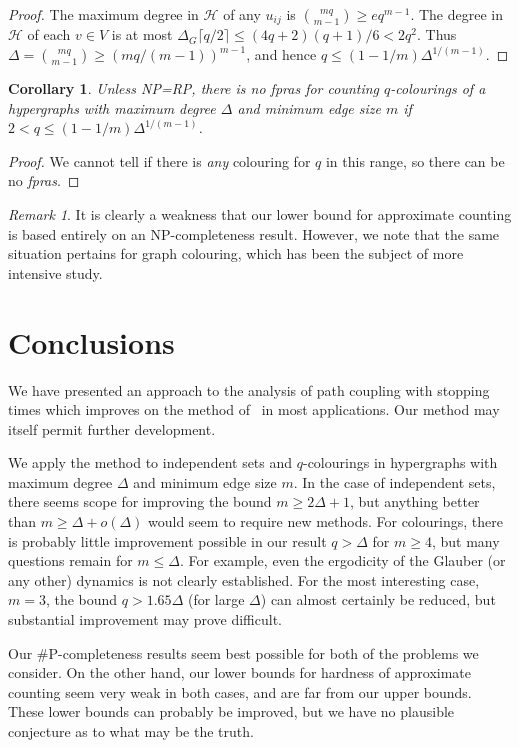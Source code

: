 \documentclass[11pt]{article}
\newtheorem{cor}[thm]{Corollary}
\theoremstyle{definition}
\theoremstyle{remark}
\newtheorem{rem}[thm]{Remark}
\newcommand{\CH}{\mathcal{H}}
\begin{document}
\begin{proof}
The maximum degree in $\CH$ of any $u_{ij}$ is $\binom{mq}{m-1} \geq
eq^{m-1}$. The degree in $\CH$ of each $v\in V$ is at most $\Delta_G\lceil
q/2\rceil \leq (4q+2)(q+1)/6 < 2q^2$. Thus $\Delta=\binom{mq}{m-1}\geq
(mq/(m-1))^{m-1}$, and hence $q\leq (1-1/m)\Delta^{1/(m-1)}$.
\end{proof}
\begin{cor}\label{h-cor10}
Unless NP\/=\/RP, there is no \emph{fpras} for counting $q$-colourings of a
hypergraphs with maximum degree $\Delta$ and minimum edge size $m$ if $2 <
q\leq (1-1/m)\Delta^{1/(m-1)}$.
\end{cor}
\begin{proof}
We cannot tell if there is \emph{any} colouring for $q$ in this range, so
there can be no \emph{fpras}.
\end{proof}
\begin{rem}
It is clearly a weakness that our lower bound for approximate counting is
based entirely on an NP-completeness result. However, we note that the same
situation pertains for  graph colouring, which has been the subject of more
intensive study.
\end{rem}
\section{Conclusions}
We have presented an approach to the analysis of path coupling with
stopping times which improves on the method of~\cite{HV04} in most
applications. Our method may itself permit further development.

We apply the method to independent sets and $q$-colourings in hypergraphs
with maximum degree $\Delta$ and minimum edge size $m$. In the case of
independent sets, there seems scope for improving the bound $m\geq 2\Delta
+1$, but anything better than $m\geq \Delta+o(\Delta)$ would seem to
require new methods. For colourings, there is probably little improvement
possible in our result $q >\Delta$ for $m\geq 4$, but many questions remain
for $m\leq \Delta$. For example, even the ergodicity of the Glauber (or any
other) dynamics is not clearly established. For the most interesting case,
$m=3$, the bound $q>1.65\Delta$ (for large $\Delta$) can almost certainly
be reduced, but substantial improvement may prove difficult.

Our \#P-completeness results seem best possible for both of the problems we
consider. On the other hand, our lower bounds for hardness of approximate
counting seem very weak in both cases, and are far from our upper bounds.
These lower bounds can probably be improved, but we have no plausible
conjecture as to what may be the truth.
\end{document}
